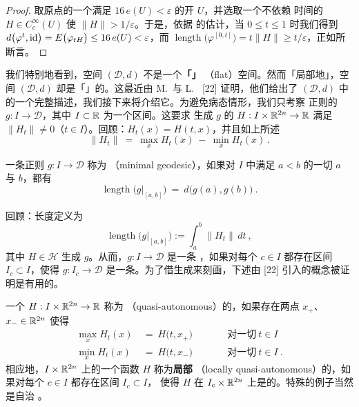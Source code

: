 \begin{proof}
取原点的一个满足 $16\,e(U)<\varepsilon$ 的开\trNeighborhood{} $U$，并选取一个不依赖%
时间的 $H\in C^{\infty}_{c}(U)$ 使 $\lVert H\rVert>1/\varepsilon$。于是，依据%
\trSikorav{}的估计，当 $0\leq t\leq1$ 时我们得到 $d\bigl(\varphi^{t},\id\bigr)=%
E\bigl(\varphi_{tH}\bigr)\leq16\,e(U)<\varepsilon$，而 $\operatorname{length}%
\bigl(\varphi^{[0,t]}\bigr)=t\lVert H\rVert\geq t/\varepsilon$，正如所断言。
\end{proof}

我们特别地看到，\trMetric{}空间 $(\mathcal{D},d)$ 不是一个\textbf{「\trFlat{}」}%
（flat）空间。然而「局部地」，空间 $(\mathcal{D},d)$ 却是「\trFlat{}」的。这最近由%
M.~\trBialy{}与 L.~\trPolterovich{} [22] 证明，他们给出了 $(\mathcal{D},d)$ 中%
\trGeodesic{}的一个完整描述，我们接下来将介绍它。为避免病态情形，我们只考察%
正则的\trSmooth\trPath{} $g:I\to\mathcal{D}$，其中 $I\subset\mathbb{R}$ 为一个区间。这要求%
生成\trPath{} $g$ 的\trHamiltonianFunction{} $H:I\times\mathbb{R}^{2n}\to\mathbb{R}$ 满足%
$\lVert H_{t}\rVert\neq0$（$t\in I$）。回顾：$H_{t}(x)=H(t,x)$，并且如上所述
\[
\lVert H_{t}\rVert\ =\ \max_{x}H_{t}(x)\ -\ \min_{x}H_{t}(x)\ .
\]

\begin{definition}\label{def:minimal-geodesic}
一条正则\trSmooth\trPath{} $g:I\to\mathcal{D}$ 称为\textbf{\trMinimal\trGeodesic}%
（minimal geodesic），如果对 $I$ 中满足 $a<b$ 的一切 $a$ 与 $b$，都有
\[
\operatorname{length}\bigl(g|_{[a,b]}\bigr)\ =\ d\bigl(g(a),g(b)\bigr)\ .
\]
\end{definition}

回顾：长度定义为
\[
\operatorname{length}\bigl(g|_{[a,b]}\bigr):=\int_{a}^{b}\lVert H_{t}\rVert\,dt\ ,
\]
其中 $H\in\mathcal{H}$ 生成\trPath{} $g$。从而，$g:I\to\mathcal{D}$ 是一条\trGeodesic%
，如果对每个 $c\in I$ 都存在区间 $I_{c}\subset I$，使得 $g:I_{c}\to\mathcal{D}$%
是一条\trMinimal\trGeodesic。为了借生成\trHamiltonianFunction{}来刻画\trGeodesic，下述由%
[22] 引入的概念被证明是有用的。

\begin{definition}\label{def:quasi-autonomous}
一个\trSmooth\trHamiltonianFunction{} $H:I\times\mathbb{R}^{2n}\to\mathbb{R}$ 称为\textbf{\trQuasiAutonomous}%
（quasi-autonomous）的，如果存在两点 $x_{+}$、$x_{-}\in\mathbb{R}^{2n}$ 使得
\begin{align*}
\max_{x}H_{t}(x)\ &=\ H\bigl(t,x_{+}\bigr)\qquad&&\text{对一切}\ t\in I\\
\min_{x}H_{t}(x)\ &=\ H\bigl(t,x_{-}\bigr)\qquad&&\text{对一切}\ t\in I\ .
\end{align*}
相应地，$I\times\mathbb{R}^{2n}$ 上的一个函数 $H$ 称为\textbf{局部\trQuasiAutonomous}%
（locally quasi-autonomous）的，如果对每个 $c\in I$ 都存在区间 $I_{c}\subset I$，%
使得 $H$ 在 $I_{c}\times\mathbb{R}^{2n}$ 上是\trQuasiAutonomous{}的。特殊的例子当然是自治%
\trHamiltonianFunction。
\end{definition}

